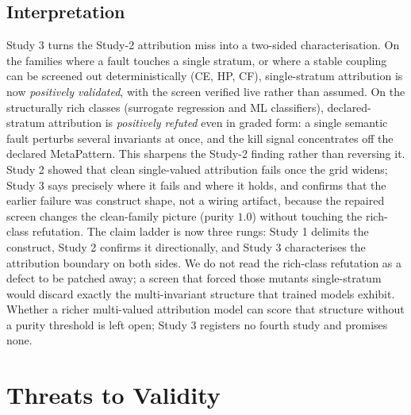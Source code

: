 \documentclass[manuscript,screen,review]{acmart}
\begin{document}
\subsection{Interpretation}\label{study3-interpretation}

Study 3 turns the Study-2 attribution miss into a two-sided characterisation. On
the families where a fault touches a single stratum, or where a stable coupling
can be screened out deterministically (CE, HP, CF), single-stratum attribution
is now \emph{positively validated}, with the screen verified live rather than
assumed. On the structurally rich classes (surrogate regression and ML
classifiers), declared-stratum attribution is \emph{positively refuted} even in
graded form: a single semantic fault perturbs several invariants at once, and
the kill signal concentrates off the declared MetaPattern. This sharpens the
Study-2 finding rather than reversing it. Study 2 showed that clean
single-valued attribution fails once the grid widens; Study 3 says precisely
where it fails and where it holds, and confirms that the earlier failure was
construct shape, not a wiring artifact, because the repaired screen changes the
clean-family picture (purity \(1.0\)) without touching the rich-class
refutation. The claim ladder is now three rungs: Study 1 delimits the construct,
Study 2 confirms it directionally, and Study 3 characterises the attribution
boundary on both sides. We do not read the rich-class refutation as a defect to
be patched away; a screen that forced those mutants single-stratum would discard
exactly the multi-invariant structure that trained models exhibit. Whether a
richer multi-valued attribution model can score that structure without a purity
threshold is left open; Study 3 registers no fourth study and promises none.

\section{Threats to Validity}\label{threats-to-validity}
\end{document}
